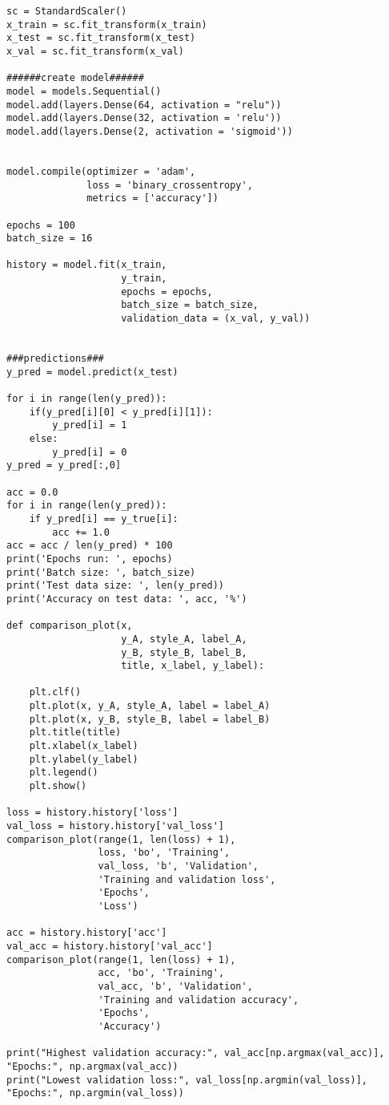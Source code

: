 \begin{lstlisting}
sc = StandardScaler()
x_train = sc.fit_transform(x_train)
x_test = sc.fit_transform(x_test)
x_val = sc.fit_transform(x_val)

######create model######
model = models.Sequential()
model.add(layers.Dense(64, activation = "relu"))
model.add(layers.Dense(32, activation = 'relu'))
model.add(layers.Dense(2, activation = 'sigmoid'))


model.compile(optimizer = 'adam',
              loss = 'binary_crossentropy',
              metrics = ['accuracy'])

epochs = 100
batch_size = 16

history = model.fit(x_train,
                    y_train,
                    epochs = epochs,
                    batch_size = batch_size,
                    validation_data = (x_val, y_val))


###predictions###
y_pred = model.predict(x_test)

for i in range(len(y_pred)):
    if(y_pred[i][0] < y_pred[i][1]):
        y_pred[i] = 1
    else:
        y_pred[i] = 0
y_pred = y_pred[:,0]

acc = 0.0
for i in range(len(y_pred)):
    if y_pred[i] == y_true[i]:
        acc += 1.0
acc = acc / len(y_pred) * 100
print('Epochs run: ', epochs)
print('Batch size: ', batch_size)
print('Test data size: ', len(y_pred))
print('Accuracy on test data: ', acc, '%')

def comparison_plot(x, 
                    y_A, style_A, label_A, 
                    y_B, style_B, label_B, 
                    title, x_label, y_label):
    
    plt.clf()
    plt.plot(x, y_A, style_A, label = label_A)
    plt.plot(x, y_B, style_B, label = label_B)
    plt.title(title)
    plt.xlabel(x_label)
    plt.ylabel(y_label)
    plt.legend()
    plt.show()

loss = history.history['loss']
val_loss = history.history['val_loss']
comparison_plot(range(1, len(loss) + 1),
                loss, 'bo', 'Training',
                val_loss, 'b', 'Validation',
                'Training and validation loss',
                'Epochs',
                'Loss')

acc = history.history['acc']
val_acc = history.history['val_acc']
comparison_plot(range(1, len(loss) + 1),
                acc, 'bo', 'Training',
                val_acc, 'b', 'Validation',
                'Training and validation accuracy',
                'Epochs',
                'Accuracy')

print("Highest validation accuracy:", val_acc[np.argmax(val_acc)], "Epochs:", np.argmax(val_acc))
print("Lowest validation loss:", val_loss[np.argmin(val_loss)], "Epochs:", np.argmin(val_loss))


\end{lstlisting}